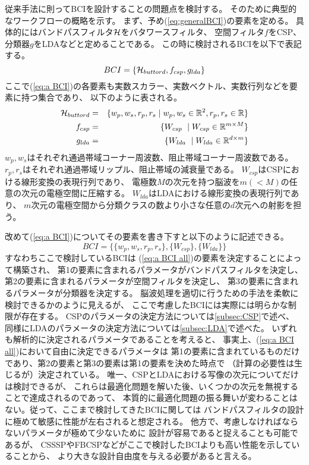 従来手法に則ってBCIを設計することの問題点を検討する。
そのために典型的なワークフローの概略を示す。
まず、予め(\ref{eq:generalBCI})の要素を定める。
具体的にはバンドパスフィルタ\(\cal H\)をバタワースフィルタ、
空間フィルタ\(f\)をCSP、分類器\(g\)をLDAなどと定めることである。
この時に検討されるBCIを以下で表記する。
\begin{equation}
    BCI=\{{\cal H}_{buttord},f_{csp},g_{lda}\}
    \label{eq:a BCI}
\end{equation}
ここで(\ref{eq:a BCI})の各要素も実数スカラー、実数ベクトル、実数行列などを要素に持つ集合であり、
以下のように表される。
\begin{eqnarray}
    {\cal H}_{buttord} &=& \{w_p,w_s,r_p,r_s \mid w_p,w_s \in \mathbb R^2, r_p,r_s \in \mathbb R\} \\
    \label{eq:H_buttord}
    f_{csp} &=& \{W_{csp}\ \mid W_{csp} \in \mathbb R^{m\times M} \}\\
    \label{eq:f_csp}
    g_{lda} &=& \{W_{lda}\ \mid W_{lda} \in \mathbb R^{d \times m}\}    
    \label{eq:g_lda}
\end{eqnarray}
\(w_p,w_s\)はそれぞれ通過帯域コーナー周波数、阻止帯域コーナー周波数である。
\(r_p,r_s\)はそれぞれ通過帯域リップル、阻止帯域の減衰量である。
\(W_{csp}\)はCSPにおける線形変換の表現行列であり、
電極数\(M\)の次元を持つ脳波を\(m (< M)\)の任意の次元の電極空間に圧縮する。
\(W_{lda}\)はLDAにおける線形変換の表現行列であり、
\(m\)次元の電極空間から分類クラスの数より小さな任意の\(d\)次元への射影を担う。

改めて(\ref{eq:a BCI})についてその要素を書き下すと以下のように記述できる。
\begin{equation}
    BCI=\{\{w_p,w_s,r_p,r_s\},
    \{W_{csp}\},
    \{W_{lda}\}\}
    \label{eq:a BCI all}
\end{equation}
すなわちここで検討しているBCIは
(\ref{eq:a BCI all})の要素を決定することによって構築され、
第1の要素に含まれるパラメータがバンドパスフィルタを決定し、
第2の要素に含まれるパラメータが空間フィルタを決定し、
第3の要素に含まれるパラメータが分類器を決定する。
脳波処理を適切に行うための手法を柔軟に検討できるかのように見えるが、
ここで考慮したBCIには実際には明らかな制限が存在する。
CSPのパラメータの決定方法については\ref{subsec:CSP}で述べ、
同様にLDAのパラメータの決定方法については\ref{subsec:LDA}で述べた。
いずれも解析的に決定されるパラメータであることを考えると、
事実上、(\ref{eq:a BCI all})において自由に決定できるパラメータは
第1の要素に含まれているものだけであり、第2の要素と第3の要素は第1の要素を決めた時点で
（計算の必要性は生じるが）決定されている。
唯一、CSPとLDAにおける写像の次元についてだけは検討できるが、
これらは最適化問題を解いた後、いくつかの次元を無視することで達成されるのであって、
本質的に最適化問題の振る舞いが変わることはない。従って、ここまで検討してきたBCIに関しては
バンドパスフィルタの設計に極めて敏感に性能が左右されると想定される。
他方で、考慮しなければならないパラメータが極めて少ないために
設計が容易であると捉えることも可能であるが、
CSSSPやFBCSPなどがここで検討したBCIよりも高い性能を示していることから、
より大きな設計自由度を与える必要があると言える。
